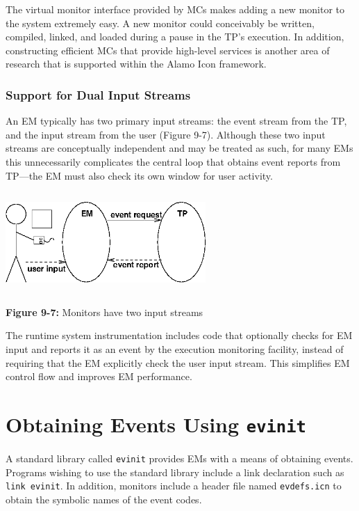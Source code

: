 The virtual monitor interface provided by MCs makes adding a new monitor to
the system extremely easy.  A new monitor could conceivably be written,
compiled, linked, and loaded during a pause in the TP's execution. In
addition, constructing efficient MCs that provide high-level services is
another area of research that is supported within the Alamo Icon framework.

\subsubsection*{Support for Dual Input Streams}

An EM typically has two primary input streams: the event stream from
the TP, and the input stream from the user (Figure 9-7).  Although
these two input streams are conceptually independent and may be
treated as such, for many EMs this unnecessarily complicates
the central loop that obtains event reports from TP---the EM must
also check its own window for user activity.

\begin{center}
\includegraphics[width=3.0in,height=1.5in]{eventstr.png}
\end{center}

{\sffamily\bfseries Figure 9-7:}
{\sffamily Monitors have two input streams}

\bigskip


The runtime system instrumentation includes code that optionally
checks for EM input and reports it as an event by the execution
monitoring facility, instead of requiring that the EM explicitly check
the user input stream.  This simplifies EM control 
flow and improves EM performance.

\section{Obtaining Events Using {\tt evinit}}

A standard library called {\tt evinit} provides EMs with
a means of obtaining events.  Programs wishing to use the
standard library include a link declaration such as {\tt link
evinit}.
In addition, monitors include a header file named {\tt evdefs.icn}
to obtain the symbolic names of the event codes.

